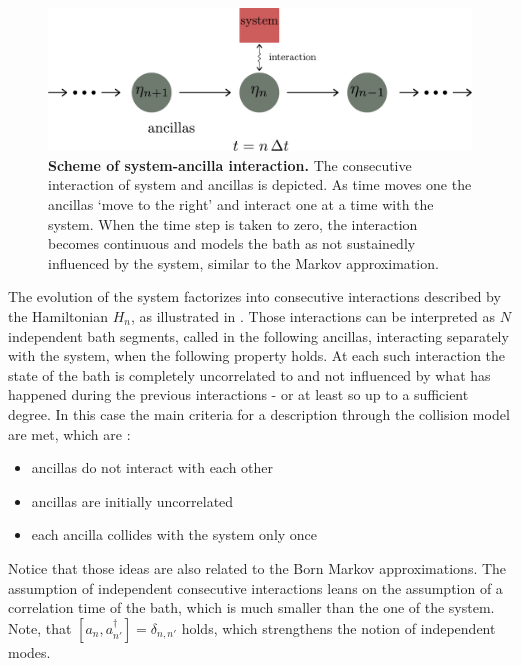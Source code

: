 \begin{figure}
    \includegraphics[width=\textwidth]{pictures/cm_scheme.pdf}
    \caption{\textbf{Scheme of system-ancilla interaction.} The consecutive interaction of system and ancillas is depicted. As time moves one the ancillas {\lq move to the right\rq} and interact one at a time with the system. When the time step is taken to zero, the interaction becomes continuous and models the bath as not sustainedly influenced by the system, similar to the Markov approximation.}\label{fig:cm_scheme}
\end{figure}
The evolution of the system factorizes into consecutive interactions described by the Hamiltonian $H_n$, as illustrated in . Those interactions can be interpreted as $N$ independent bath segments, called in the following ancillas, interacting separately with the system, when the following property holds. At each such interaction the state of the bath is completely uncorrelated  to and not influenced by what has happened during the previous interactions - or at least so up to a sufficient degree. In this case the main criteria for a description through the collision model are met, which are \cite{ciccarello_quantum_2022}: 
\begin{itemize}
    \item ancillas do not interact with each other 
    \item ancillas are initially uncorrelated 
    \item each ancilla collides with the system only once 
\end{itemize}
Notice that those ideas are also related to the Born Markov approximations. The assumption of independent consecutive interactions leans on the assumption of a correlation time of the bath, which is much smaller than the one of the system. Note, that $[a_n,a^\dagger_{n'}]=\delta_{n,n'}$ holds, which strengthens the notion of independent modes.\\\\%
